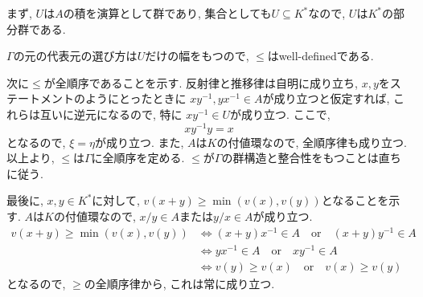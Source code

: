 \documentclass[dvipdfmx]{jsarticle}
\begin{document}
    \begin{problem}
        まず, $U$は$A$の積を演算として群であり,
        集合としても$U \subseteq K^\ast$なので, $U$は$K^\ast$の部分群である.

        $\Gamma$の元の代表元の選び方は$U$だけの幅をもつので,
        $\leqslant$はwell-definedである.

        次に$\leqslant$が全順序であることを示す.
        反射律と推移律は自明に成り立ち,
        $x,y$をステートメントのようにとったときに
        $xy^{-1}, yx^{-1} \in A$が成り立つと仮定すれば,
        これらは互いに逆元になるので, 特に
        $xy^{-1} \in U$が成り立つ.
        ここで,
        \[
            xy^{-1}y = x
        \]
        となるので, $\xi = \eta$が成り立つ.
        また, $A$は$K$の付値環なので, 全順序律も成り立つ.
        以上より, $\leqslant$は$\Gamma$に全順序を定める.
        $\leqslant$が$\Gamma$の群構造と整合性をもつことは直ちに従う.

        最後に, $x, y \in K^\ast$に対して, $v(x+y) \geqslant \min(v(x), v(y))$となることを示す.
        $A$は$K$の付値環なので,
        $x/y \in A$または$y/x \in A$が成り立つ.
        \begin{align*}
            v(x+y) \geqslant \min(v(x), v(y))
            &\Longleftrightarrow (x + y)x^{-1} \in A \quad \mbox{or} \quad (x+y)y^{-1} \in A\\
            &\Longleftrightarrow yx^{-1} \in A \quad \mbox{or} \quad xy^{-1} \in A\\
            &\Longleftrightarrow v(y) \geqslant v(x) \quad \mbox{or} \quad v(x) \geqslant v(y)
        \end{align*}
        となるので, $\geqslant$の全順序律から, これは常に成り立つ.
    \end{problem}
\end{document}
